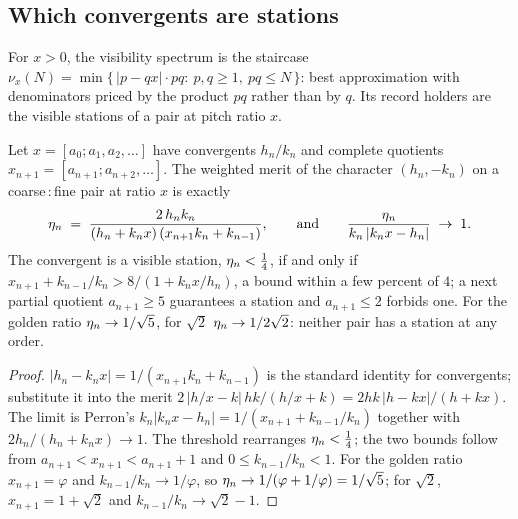 \subsection{Which convergents are stations}
\label{sec:visibility}

\begin{definition}
\label{def:visibility}
For $x>0$, the visibility spectrum is the staircase
$\nu_x(N)=\min\{\,|p-qx|\cdot pq:\ p,q\ge1,\ pq\le N\,\}$: best approximation
with denominators priced by the product $pq$ rather than by $q$. Its record
holders are the visible stations of a pair at pitch ratio $x$.
\end{definition}

\begin{proposition}
\label{prop:stations}
Let $x=[a_0;a_1,a_2,\dots]$ have convergents $h_n/k_n$ and complete quotients
$x_{n+1}=[a_{n+1};a_{n+2},\dots]$. The weighted merit of the character
$(h_n,-k_n)$ on a coarse\,:\,fine pair at ratio $x$ is exactly
\[
  \eta_n \;=\; \frac{2\,h_nk_n}{(h_n+k_nx)\,(x_{n+1}k_n+k_{n-1})},
  \qquad\text{and}\qquad
  \frac{\eta_n}{k_n\,|k_nx-h_n|}\;\to\;1 .
\]
The convergent is a visible station, $\eta_n<\tfrac14$, if and only if
$x_{n+1}+k_{n-1}/k_n>8/(1+k_nx/h_n)$, a bound within a few percent of $4$; a
next partial quotient $a_{n+1}\ge5$ guarantees a station and $a_{n+1}\le2$
forbids one. For the golden ratio $\eta_n\to1/\sqrt5$, for $\sqrt2$
$\eta_n\to1/2\sqrt2$: neither pair has a station at any order.
\end{proposition}

\begin{proof}
$|h_n-k_nx|=1/(x_{n+1}k_n+k_{n-1})$ is the standard identity for convergents;
substitute it into the merit $2\,|h/x-k|\,hk/(h/x+k)=2hk\,|h-kx|/(h+kx)$. The
limit is Perron's $k_n|k_nx-h_n|=1/(x_{n+1}+k_{n-1}/k_n)$ together with
$2h_n/(h_n+k_nx)\to1$. The threshold rearranges $\eta_n<\tfrac14$; the two
bounds follow from $a_{n+1}<x_{n+1}<a_{n+1}+1$ and $0\le k_{n-1}/k_n<1$. For
the golden ratio $x_{n+1}=\varphi$ and $k_{n-1}/k_n\to1/\varphi$, so
$\eta_n\to1/(\varphi+1/\varphi)=1/\sqrt5$; for $\sqrt2$, $x_{n+1}=1+\sqrt2$ and
$k_{n-1}/k_n\to\sqrt2-1$.
\end{proof}


